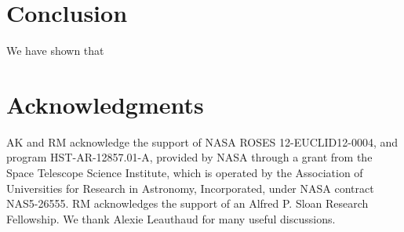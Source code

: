 \documentclass[twocolumn,useAMS,usenatbib]{mn2e}
\begin{document}
\section{Conclusion}
\label{S:conclusion}

We have shown that 
\section*{Acknowledgments}

AK and RM acknowledge the support of NASA ROSES 12-EUCLID12-0004, and
program HST-AR-12857.01-A, provided by NASA through a grant from the
Space Telescope Science Institute, which is operated by the
Association of Universities for Research in Astronomy, Incorporated,
under NASA contract NAS5-26555. RM acknowledges the support of an Alfred P. Sloan Research Fellowship.  We thank Alexie Leauthaud for 
many useful discussions.



\end{document}
